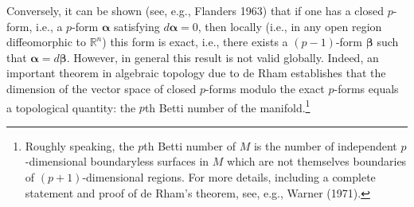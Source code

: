 Conversely, it can be shown (see, e.g., Flanders 1963) that if one has a closed
\(p\)-form, i.e., a \(p\)-form \(\boldsymbol\alpha\) satisfying
\(d\boldsymbol\alpha=0\), then locally (i.e., in any open region diffeomorphic to
\(\mathbb R^n\)) this form is exact, i.e., there exists a \((p-1)\)-form
\(\boldsymbol\beta\) such that \(\boldsymbol\alpha=d\boldsymbol\beta\). However, in
general this result is not valid globally. Indeed, an important theorem in algebraic
topology due to de Rham establishes that the dimension of the vector space of closed
\(p\)-forms modulo the exact \(p\)-forms equals a topological quantity: the \(p\)th
Betti number of the manifold.\footnote{Roughly speaking, the \(p\)th Betti number of
\(M\) is the number of independent \(p\)-dimensional boundaryless surfaces in \(M\)
which are not themselves boundaries of \((p+1)\)-dimensional regions. For more
details, including a complete statement and proof of de Rham's theorem, see, e.g.,
Warner (1971).}
